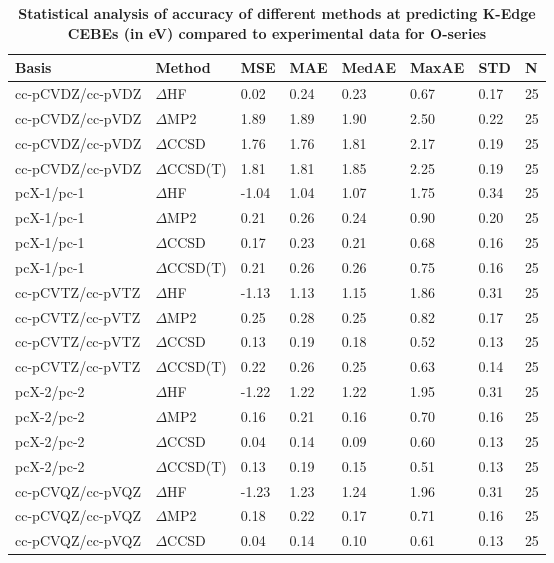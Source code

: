 \begin{table}
  \caption{\textbf{Statistical analysis of accuracy of different methods at predicting K-Edge CEBEs (in eV) compared to experimental data for O-series}}
  \begin{tabular}{l l l l l l l l }
    \toprule
    \textbf{Basis} & \textbf{Method} & \textbf{MSE} & \textbf{MAE} & \textbf{MedAE} & \textbf{MaxAE} & \textbf{STD} & \textbf{N} \\ 
    \midrule
    cc-pCVDZ/cc-pVDZ & $\Delta$HF & 0.02 & 0.24 & 0.23 & 0.67 & 0.17 & 25 \\ 
    cc-pCVDZ/cc-pVDZ & $\Delta$MP2 & 1.89 & 1.89 & 1.90 & 2.50 & 0.22 & 25 \\ 
    cc-pCVDZ/cc-pVDZ & $\Delta$CCSD & 1.76 & 1.76 & 1.81 & 2.17 & 0.19 & 25 \\ 
    cc-pCVDZ/cc-pVDZ & $\Delta$CCSD(T) & 1.81 & 1.81 & 1.85 & 2.25 & 0.19 & 25 \\ 
    pcX-1/pc-1 & $\Delta$HF & -1.04 & 1.04 & 1.07 & 1.75 & 0.34 & 25 \\ 
    pcX-1/pc-1 & $\Delta$MP2 & 0.21 & 0.26 & 0.24 & 0.90 & 0.20 & 25 \\ 
    pcX-1/pc-1 & $\Delta$CCSD & 0.17 & 0.23 & 0.21 & 0.68 & 0.16 & 25 \\ 
    pcX-1/pc-1 & $\Delta$CCSD(T) & 0.21 & 0.26 & 0.26 & 0.75 & 0.16 & 25 \\ 
    cc-pCVTZ/cc-pVTZ & $\Delta$HF & -1.13 & 1.13 & 1.15 & 1.86 & 0.31 & 25 \\ 
    cc-pCVTZ/cc-pVTZ & $\Delta$MP2 & 0.25 & 0.28 & 0.25 & 0.82 & 0.17 & 25 \\ 
    cc-pCVTZ/cc-pVTZ & $\Delta$CCSD & 0.13 & 0.19 & 0.18 & 0.52 & 0.13 & 25 \\ 
    cc-pCVTZ/cc-pVTZ & $\Delta$CCSD(T) & 0.22 & 0.26 & 0.25 & 0.63 & 0.14 & 25 \\ 
    pcX-2/pc-2 & $\Delta$HF & -1.22 & 1.22 & 1.22 & 1.95 & 0.31 & 25 \\ 
    pcX-2/pc-2 & $\Delta$MP2 & 0.16 & 0.21 & 0.16 & 0.70 & 0.16 & 25 \\ 
    pcX-2/pc-2 & $\Delta$CCSD & 0.04 & 0.14 & 0.09 & 0.60 & 0.13 & 25 \\ 
    pcX-2/pc-2 & $\Delta$CCSD(T) & 0.13 & 0.19 & 0.15 & 0.51 & 0.13 & 25 \\ 
    cc-pCVQZ/cc-pVQZ & $\Delta$HF & -1.23 & 1.23 & 1.24 & 1.96 & 0.31 & 25 \\ 
    cc-pCVQZ/cc-pVQZ & $\Delta$MP2 & 0.18 & 0.22 & 0.17 & 0.71 & 0.16 & 25 \\ 
    cc-pCVQZ/cc-pVQZ & $\Delta$CCSD & 0.04 & 0.14 & 0.10 & 0.61 & 0.13 & 25 \\ 

\end{tabular}
\end{table}
